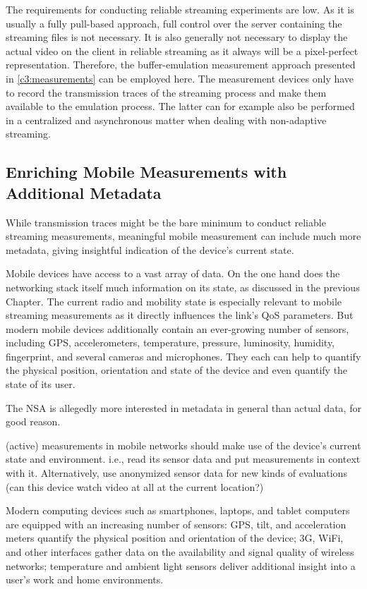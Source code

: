 The requirements for conducting reliable streaming experiments are low. As it is usually a fully pull-based approach, full control over the server containing the streaming files is not necessary. It is also generally not necessary to display the actual video on the client in reliable streaming as it always will be a pixel-perfect representation. Therefore, the buffer-emulation measurement approach presented in \ref{c3:measurements} can be employed here. The measurement devices only have to record the transmission traces of the streaming process and make them available to the emulation process. The latter can for example also be performed in a centralized and asynchronous matter when dealing with non-adaptive streaming.


\subsection{Enriching Mobile Measurements with Additional Metadata}
\label{c6:sensorium}

While transmission traces might be the bare minimum to conduct reliable streaming measurements, meaningful mobile measurement can include much more metadata, giving insightful indication of the device's current state.

Mobile devices have access to a vast array of data. On the one hand does the networking stack itself much information on its state, as discussed in the previous Chapter. The current radio and mobility state is especially relevant to mobile streaming measurements as it directly influences the link's \gls{QoS} parameters. But modern mobile devices additionally contain an ever-growing number of sensors, including \gls{GPS}, accelerometers, temperature, pressure, luminosity, humidity, fingerprint, and several cameras and microphones. They each can help to quantify the physical position, orientation and state of the device and even quantify the state of its user.

The NSA is allegedly more interested in metadata in general than actual data, for good reason.

(active) measurements in mobile networks should make use of the device's current state and environment. i.e., read its sensor data and put measurements in context with it. Alternatively, use anonymized sensor data for new kinds of evaluations (can this device watch video at all at the current location?)

Modern computing devices such as smartphones, laptops, and tablet computers are equipped with an increasing number of sensors: \gls{GPS}, tilt, and acceleration meters quantify the physical position and orientation of the device; 3G, WiFi, and other  interfaces gather data on the availability and signal quality of wireless networks; temperature and ambient light sensors deliver additional insight into a user's work and home environments.


